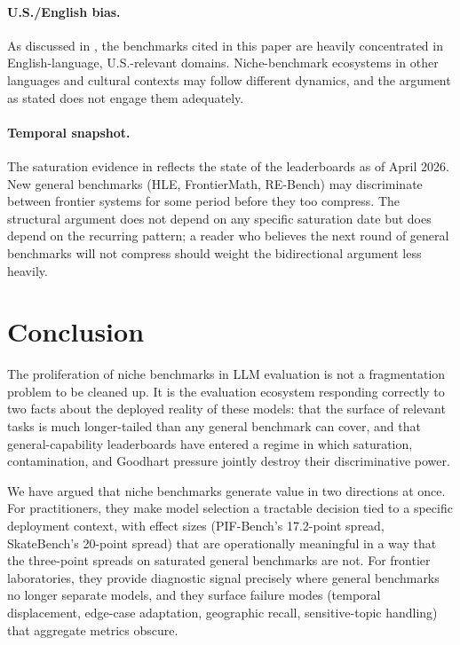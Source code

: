 \documentclass[11pt,a4paper]{article}
\begin{document}
\paragraph{U.S./English bias.} As discussed in , the benchmarks cited in this paper are heavily concentrated in English-language, U.S.-relevant domains. Niche-benchmark ecosystems in other languages and cultural contexts may follow different dynamics, and the argument as stated does not engage them adequately.

\paragraph{Temporal snapshot.} The saturation evidence in  reflects the state of the leaderboards as of April 2026. New general benchmarks (HLE, FrontierMath, RE-Bench) may discriminate between frontier systems for some period before they too compress. The structural argument does not depend on any specific saturation date but does depend on the recurring pattern; a reader who believes the next round of general benchmarks will not compress should weight the bidirectional argument less heavily.

\section{Conclusion}
\label{sec:conclusion}

The proliferation of niche benchmarks in LLM evaluation is not a fragmentation problem to be cleaned up. It is the evaluation ecosystem responding correctly to two facts about the deployed reality of these models: that the surface of relevant tasks is much longer-tailed than any general benchmark can cover, and that general-capability leaderboards have entered a regime in which saturation, contamination, and Goodhart pressure jointly destroy their discriminative power.

We have argued that niche benchmarks generate value in two directions at once. For practitioners, they make model selection a tractable decision tied to a specific deployment context, with effect sizes (PIF-Bench's 17.2-point spread, SkateBench's 20-point spread) that are operationally meaningful in a way that the three-point spreads on saturated general benchmarks are not. For frontier laboratories, they provide diagnostic signal precisely where general benchmarks no longer separate models, and they surface failure modes (temporal displacement, edge-case adaptation, geographic recall, sensitive-topic handling) that aggregate metrics obscure.
\end{document}
